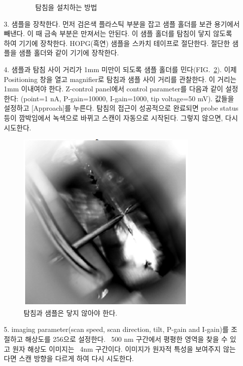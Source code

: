 \documentclass[aps,reprint,superscriptaddress,11pt]{revtex4-2}
\begin{document}
\begin{itemize}
\begin{small}
\begin{enumerate}
\begin{figure}[htp]
        \caption{탐침을 설치하는 방법}
        \label{fig:4}
      \end{figure}
  \end{enumerate}
  \end{small}
  \item[3. ] 샘플을 장착한다. 먼저 검은색 플라스틱 부분을 잡고 샘플 홀더를 보관 용기에서 빼낸다.
  이 때 금속 부분은 만져서는 안된다. 이 샘플 홀더를 탐침이 닿지 않도록 하여 기기에 장착한다.
  HOPG(흑연) 샘플을 스카치 테이프로 절단한다. 절단한 샘플을 샘플 홀더와 같이 기기에 장착한다.
  \item[4. ] 샘플과 탐침 사이 거리가 1mm 미만이 되도록 샘플 홀더를 민다(FIG.~\ref{fig:4}). 
  이제 Positioning 창을 열고 magnifier로 탐침과 샘플 사이 거리를 관찰한다. 이 거리는 
  1mm 이내여야 한다. Z-control panel에서 control parameter를 다음과 같이 설정한다: 
  (point=1 nA, P-gain=10000, I-gain=1000, tip voltage=50 mV). 값들을 설정하고 [Approach]를
  누른다. 탐침의 접근이 성공적으로 완료되면 probe status등이 깜박임에서 녹색으로 바뀌고 스캔이
  자동으로 시작된다. 그렇지 않으면, 다시 시도한다.
  \begin{figure}[htp]
    \centering
    \includegraphics[scale=0.3]{approach.png}
    \caption{탐침과 샘플은 닿지 않아야 한다.}
    \label{fig:4}
  \end{figure}
  \item[5. ] imaging parameter(scan speed, scan direction, tilt, P-gain and I-gain)를 
  조절하고 해상도를 256으로 설정한다. ~500 nm 구간에서 평평한 영역을 찾을 수 있고 원자 해상도
  이미지는 ~4nm 구간이다. 이미지가 원자적 특성을 보여주지 않는다면 스캔 방향을 다르게 하여 다시
  시도한다.
\end{itemize}

\nocite{*}





\vfill
\end{document}
